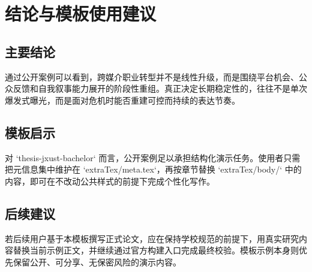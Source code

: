 \chapter{结论与模板使用建议}

\section{主要结论}

通过公开案例可以看到，跨媒介职业转型并不是线性升级，而是围绕平台机会、公众反馈和自我叙事能力展开的阶段性重组。真正决定长期稳定性的，往往不是单次爆发式曝光，而是面对危机时能否重建可控而持续的表达节奏\cite{Sun}。

\section{模板启示}

对 `thesis-jxust-bachelor` 而言，公开案例足以承担结构化演示任务。使用者只需把元信息集中维护在 `extraTex/meta.tex`，再按章节替换 `extraTex/body/` 中的内容，即可在不改动公共样式的前提下完成个性化写作\cite{Chen}。

\section{后续建议}

若后续用户基于本模板撰写正式论文，应在保持学校规范的前提下，用真实研究内容替换当前示例正文，并继续通过官方构建入口完成最终校验。模板示例本身则优先保留公开、可分享、无保密风险的演示内容。
